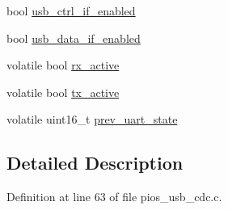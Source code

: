 \begin{DoxyCompactItemize}
\item 
bool \hyperlink{group___p_i_o_s___u_s_b___c_o_m_ga27ad044c09bb6b13874d1d1281aa397f}{usb\-\_\-ctrl\-\_\-if\-\_\-enabled}
\item 
bool \hyperlink{group___p_i_o_s___u_s_b___c_o_m_gaa0a4b4afa2a6f6c20709f878b026ecc5}{usb\-\_\-data\-\_\-if\-\_\-enabled}
\item 
volatile bool \hyperlink{group___p_i_o_s___u_s_b___c_o_m_gad41e79606da14368c2716f4bc3c84618}{rx\-\_\-active}
\item 
volatile bool \hyperlink{group___p_i_o_s___u_s_b___c_o_m_ga5ebf71c716fc76c564cf8217adeb956c}{tx\-\_\-active}
\item 
volatile uint16\-\_\-t \hyperlink{group___p_i_o_s___u_s_b___c_o_m_ga945dfed2223e17061cb6e4257c2b2624}{prev\-\_\-uart\-\_\-state}
\end{DoxyCompactItemize}


\subsection{\-Detailed \-Description}


\-Definition at line 63 of file pios\-\_\-usb\-\_\-cdc.\-c.



